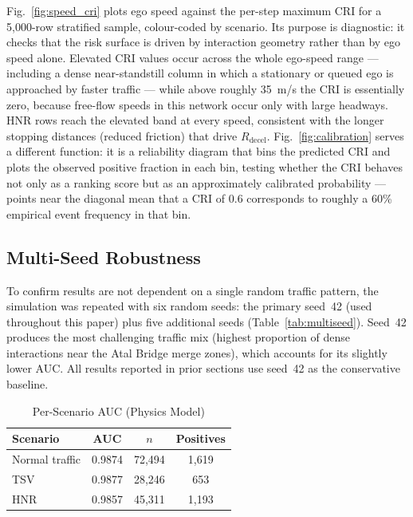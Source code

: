 \documentclass[sn-mathphys-num,Numbered,iicol]{sn-jnl}
\begin{document}
Fig.~\ref{fig:speed_cri} plots ego speed against the per-step maximum CRI for a 5{,}000-row stratified sample, colour-coded by scenario. Its purpose is diagnostic: it checks that the risk surface is driven by interaction geometry rather than by ego speed alone. Elevated CRI values occur across the whole ego-speed range --- including a dense near-standstill column in which a stationary or queued ego is approached by faster traffic --- while above roughly 35~m/s the CRI is essentially zero, because free-flow speeds in this network occur only with large headways. HNR rows reach the elevated band at every speed, consistent with the longer stopping distances (reduced friction) that drive $R_{\mathrm{decel}}$. Fig.~\ref{fig:calibration} serves a different function: it is a reliability diagram that bins the predicted CRI and plots the observed positive fraction in each bin, testing whether the CRI behaves not only as a ranking score but as an approximately calibrated probability --- points near the diagonal mean that a CRI of 0.6 corresponds to roughly a 60\% empirical event frequency in that bin.

\subsection{Multi-Seed Robustness}\label{sec:multiseed}
To confirm results are not dependent on a single random traffic pattern, the simulation was repeated with six random seeds: the primary seed~42 (used throughout this paper) plus five additional seeds (Table~\ref{tab:multiseed}). Seed~42 produces the most challenging traffic mix (highest proportion of dense interactions near the Atal Bridge merge zones), which accounts for its slightly lower AUC. All results reported in prior sections use seed~42 as the conservative baseline.

\begin{table}[htbp]
  \caption{Per-Scenario AUC (Physics Model)}
  \label{tab:scenario_auc}
  \renewcommand{\arraystretch}{1.2}
  \begin{tabular}{@{}lccc@{}}
    \toprule
    \textbf{Scenario} & \textbf{AUC} & \textbf{$n$} & \textbf{Positives} \\
    \midrule
    Normal traffic & 0.9874 & 72,494 & 1,619 \\
    TSV            & 0.9877 & 28,246 & 653   \\
    HNR            & 0.9857 & 45,311 & 1,193 \\
    \bottomrule
  \end{tabular}
\end{table}
\end{document}
